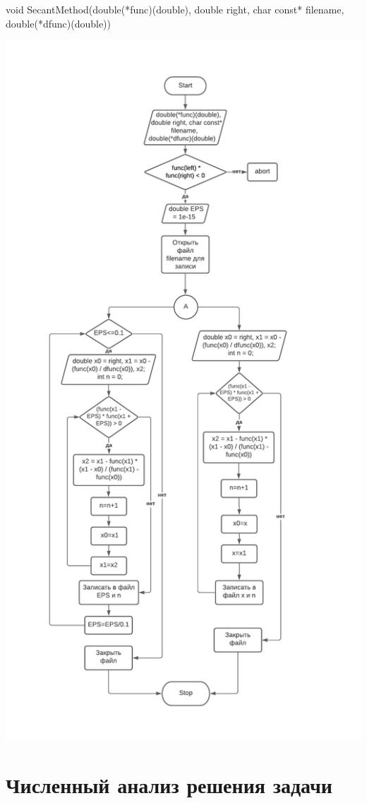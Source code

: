 void SecantMethod(double(*func)(double), double right, char const* filename, double(*dfunc)(double))

\includegraphics[scale=0.5]{block4.pdf}


\section{Численный анализ решения задачи}

